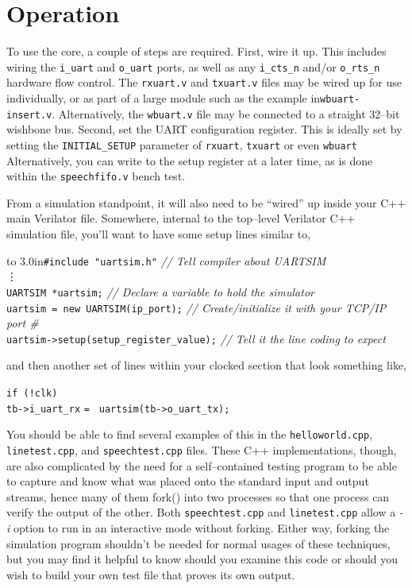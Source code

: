 \documentclass{gqtekspec}
\begin{document}
\chapter{Operation}\label{ch:ops}

%

To use the core, a couple of steps are required.  First, wire it up.  This
includes wiring the {\tt i\_uart} and {\tt o\_uart} ports, as well as any
{\tt i\_cts\_n} and/or {\tt o\_rts\_n} hardware flow control.  The
{\tt rxuart.v} and {\tt txuart.v} files may be wired up for use individually,
or as part of a large module such as the example in{\tt wbuart-insert.v}.
Alternatively, the {\tt wbuart.v} file may be connected to a straight 32--bit
wishbone bus.
Second, set the UART configuration register.  This is ideally set by setting
the {\tt INITIAL\_SETUP} parameter of {\tt rxuart}, {\tt txuart} or even
{\tt wbuart}  Alternatively, you can write to the setup register at a later
time, as is done within the {\tt speechfifo.v} bench test.

From a simulation standpoint, it will also need to be ``wired'' up inside your
C++ main Verilator file.  Somewhere, internal to the top--level Verilator
C++ simulation file, you'll want to have some setup lines similar to,
\begin{tabbing}
\hbox to 3.0in{\tt \#include "uartsim.h"} \= {\em // Tell compiler about UARTSIM}\\
\vdots \\
{\tt UARTSIM *uartsim;} \> {\em // Declare a variable to hold the simulator}\\
{\tt uartsim = new UARTSIM(ip\_port);} \> {\em // Create/initialize it with your TCP/IP port \#} \\
{\tt uartsim->setup(setup\_register\_value);} \> {\em // Tell it the line coding to expect}\\
\end{tabbing}
and then another set of lines within your clocked section that look something
like,
\begin{tabbing}
{\tt if (!clk)} \= \\
\> {\tt tb->i\_uart\_rx} {\tt = } {\tt uartsim(tb->o\_uart\_tx);}
\end{tabbing}
You should be able to find several examples of this in the {\tt helloworld.cpp},
{\tt linetest.cpp}, and {\tt speechtest.cpp} files.  These C++ implementations,
though, are also complicated by the need for a self--contained testing program
to be able to capture and know what was placed onto the standard input and
output streams, hence many of them fork() into two processes so that one
process can verify the output of the other.  Both {\tt speechtest.cpp} and
{\tt linetest.cpp} allow a {\em -i} option to run in an interactive mode without
forking.  Either way, forking the simulation program shouldn't be needed for
normal usages of these techniques, but you may find it helpful to know should
you examine this code or should you wish to build your own test file that
proves its own output.
\end{document}
